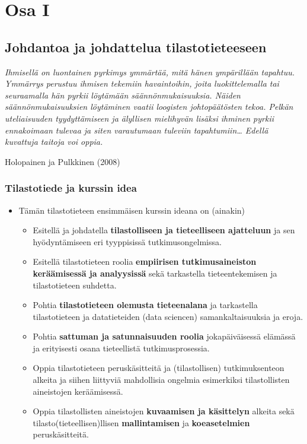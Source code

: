 \documentclass[
]{book}
\providecommand{\tightlist}{%
  \setlength{\itemsep}{0pt}\setlength{\parskip}{0pt}}
\begin{document}
\hypertarget{part-osa-i}{%
\part{Osa I}\label{part-osa-i}}

\hypertarget{johdantoa-ja-johdattelua-tilastotieteeseen}{%
\chapter{Johdantoa ja johdattelua tilastotieteeseen}\label{johdantoa-ja-johdattelua-tilastotieteeseen}}

\emph{Ihmisellä on luontainen pyrkimys ymmärtää, mitä hänen ympärillään tapahtuu. Ymmärrys perustuu ihmisen tekemiin havaintoihin, joita luokittelemalla tai seuraamalla hän pyrkii löytämään säännönmukaisuuksia. Näiden säännönmukaisuuksien löytäminen vaatii loogisten johtopäätösten tekoa. Pelkän uteliaisuuden tyydyttämiseen ja älyllisen mielihyvän lisäksi ihminen pyrkii ennakoimaan tulevaa ja siten varautumaan tuleviin tapahtumiin\ldots{} Edellä kuvattuja taitoja voi oppia.}

Holopainen ja Pulkkinen (2008)

\hypertarget{tilastotiede-ja-kurssin-idea}{%
\section{Tilastotiede ja kurssin idea}\label{tilastotiede-ja-kurssin-idea}}

\begin{itemize}
\tightlist
\item
  Tämän tilastotieteen ensimmäisen kurssin ideana on (ainakin)

  \begin{itemize}
  \tightlist
  \item
    Esitellä ja johdatella \textbf{tilastolliseen ja tieteelliseen ajatteluun} ja sen hyödyntämiseen eri tyyppisissä tutkimusongelmissa.
  \item
    Esitellä tilastotieteen roolia \textbf{empiirisen tutkimusaineiston keräämisessä ja analyysissä} sekä tarkastella tieteentekemisen ja tilastotieteen suhdetta.
  \item
    Pohtia \textbf{tilastotieteen olemusta tieteenalana} ja tarkastella tilastotieteen ja datatieteiden (data sciencen) samankaltaisuuksia ja eroja.
  \item
    Pohtia \textbf{sattuman ja satunnaisuuden roolia} jokapäiväisessä elämässä ja erityisesti osana tieteellistä tutkimusprosessia.
  \item
    Oppia tilastotieteen peruskäsitteitä ja (tilastollisen) tutkimuksenteon alkeita ja siihen liittyviä mahdollisia ongelmia esimerkiksi tilastollisten aineistojen keräämisessä.
  \item
    Oppia tilastollisten aineistojen \textbf{kuvaamisen ja käsittelyn} alkeita sekä tilasto(tieteellisen)llisen \textbf{mallintamisen} ja \textbf{koeasetelmien} peruskäsitteitä.
  \end{itemize}
\end{itemize}
\end{document}
